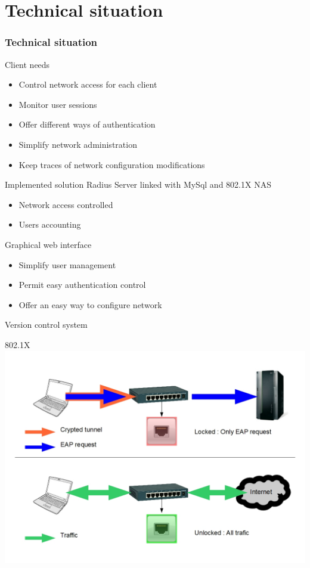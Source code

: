 \documentclass[12pt]{beamer}
\begin{document}
\part{Technical situation}
\frame{\partpage}
\section{Technical situation}

\begin{frame}{Client needs}
    \begin{itemize}
	\item Control network access for each client
	\vfill
	\item Monitor user sessions
	\vfill 
	\item Offer different ways of authentication
	\vfill
	\item Simplify network administration
	\vfill
	\item Keep traces of network configuration modifications
    \end{itemize}
\end{frame}

\begin{frame}{Implemented solution}
    Radius Server linked with MySql and 802.1X NAS
    \begin{itemize}
	\item<1-2> Network access controlled
	\item<2> Users accounting
    \end{itemize}
    \vfill
    Graphical web interface
    \begin{itemize}
	\item<0> Simplify user management
	\item<0> Permit easy authentication control
	\item<0> Offer an easy way to configure network
    \end{itemize}
    \vfill
    Version control system
\end{frame}
	
\begin{frame}{802.1X}
    \includegraphics[width=300pts]{img/dot1x.jpg}
\end{frame}
\end{document}
